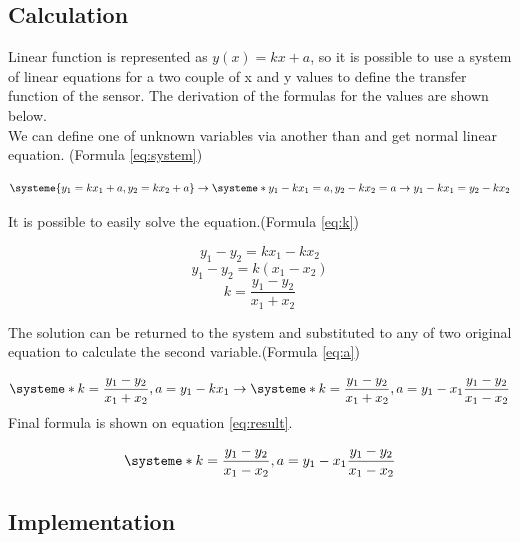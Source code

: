 \documentclass[english]{article}
\begin{document}
\subsection{Calculation}
  
Linear function is represented as $y(x) = kx + a$, so it is possible to use a system of linear equations for a two couple of x and y values to define the transfer function of the sensor. The derivation of the formulas for the values are shown below.\\

We can define one of unknown variables via another than and get normal linear equation. (Formula \ref{eq:system})

\begin{equation} \label{eq:system}
\systeme{y_1 = kx_1 + a, y_2 = kx_2 + a} \rightarrow \systeme*{y_1 - kx_1 = a, y_2 - kx_2 = a} \rightarrow y_1 - kx_1 = y_2 - kx_2 
\end{equation}

It is possible to easily solve the equation.(Formula \ref{eq:k})

\begin{equation} 
y_1 - y_2 = kx_1 - kx_2
\end{equation}
\begin{equation} 
y_1 - y_2 = k(x_1 - x_2)
\end{equation}
\begin{equation} \label{eq:k}
k = \frac{y_1 - y_2}{x_1 + x_2}
\end{equation}

The solution can be returned to the system and substituted to any of two original equation to calculate the second variable.(Formula \ref{eq:a})

\begin{equation} \label{eq:a}
\systeme*{k = \frac{y_1 - y_2}{x_1 + x_2}, a = y_1 - kx_1} \rightarrow \systeme*{k = \frac{y_1 - y_2}{x_1 + x_2}, a = y_1 - x_1\frac{y_1 - y_2}{x_1 - x_2}}
\end{equation}
Final formula is shown on equation \ref{eq:result}.

\begin{equation} \label{eq:result}
\systeme*{k = \frac{y_1 - y_2}{x_1 - x_2}, a = y_1 - x_1\frac{y_1 - y_2}{x_1 - x_2}}
\end{equation}

\subsection{Implementation}
\end{document}
